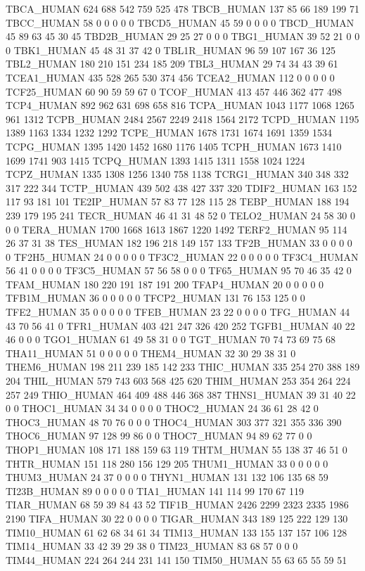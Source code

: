 TBCA_HUMAN	624	688	542	759	525	478
TBCB_HUMAN	137	85	66	189	199	71
TBCC_HUMAN	58	0	0	0	0	0
TBCD5_HUMAN	45	59	0	0	0	0
TBCD_HUMAN	45	89	63	45	30	45
TBD2B_HUMAN	29	25	27	0	0	0
TBG1_HUMAN	39	52	21	0	0	0
TBK1_HUMAN	45	48	31	37	42	0
TBL1R_HUMAN	96	59	107	167	36	125
TBL2_HUMAN	180	210	151	234	185	209
TBL3_HUMAN	29	74	34	43	39	61
TCEA1_HUMAN	435	528	265	530	374	456
TCEA2_HUMAN	112	0	0	0	0	0
TCF25_HUMAN	60	90	59	59	67	0
TCOF_HUMAN	413	457	446	362	477	498
TCP4_HUMAN	892	962	631	698	658	816
TCPA_HUMAN	1043	1177	1068	1265	961	1312
TCPB_HUMAN	2484	2567	2249	2418	1564	2172
TCPD_HUMAN	1195	1389	1163	1334	1232	1292
TCPE_HUMAN	1678	1731	1674	1691	1359	1534
TCPG_HUMAN	1395	1420	1452	1680	1176	1405
TCPH_HUMAN	1673	1410	1699	1741	903	1415
TCPQ_HUMAN	1393	1415	1311	1558	1024	1224
TCPZ_HUMAN	1335	1308	1256	1340	758	1138
TCRG1_HUMAN	340	348	332	317	222	344
TCTP_HUMAN	439	502	438	427	337	320
TDIF2_HUMAN	163	152	117	93	181	101
TE2IP_HUMAN	57	83	77	128	115	28
TEBP_HUMAN	188	194	239	179	195	241
TECR_HUMAN	46	41	31	48	52	0
TELO2_HUMAN	24	58	30	0	0	0
TERA_HUMAN	1700	1668	1613	1867	1220	1492
TERF2_HUMAN	95	114	26	37	31	38
TES_HUMAN	182	196	218	149	157	133
TF2B_HUMAN	33	0	0	0	0	0
TF2H5_HUMAN	24	0	0	0	0	0
TF3C2_HUMAN	22	0	0	0	0	0
TF3C4_HUMAN	56	41	0	0	0	0
TF3C5_HUMAN	57	56	58	0	0	0
TF65_HUMAN	95	70	46	35	42	0
TFAM_HUMAN	180	220	191	187	191	200
TFAP4_HUMAN	20	0	0	0	0	0
TFB1M_HUMAN	36	0	0	0	0	0
TFCP2_HUMAN	131	76	153	125	0	0
TFE2_HUMAN	35	0	0	0	0	0
TFEB_HUMAN	23	22	0	0	0	0
TFG_HUMAN	44	43	70	56	41	0
TFR1_HUMAN	403	421	247	326	420	252
TGFB1_HUMAN	40	22	46	0	0	0
TGO1_HUMAN	61	49	58	31	0	0
TGT_HUMAN	70	74	73	69	75	68
THA11_HUMAN	51	0	0	0	0	0
THEM4_HUMAN	32	30	29	38	31	0
THEM6_HUMAN	198	211	239	185	142	233
THIC_HUMAN	335	254	270	388	189	204
THIL_HUMAN	579	743	603	568	425	620
THIM_HUMAN	253	354	264	224	257	249
THIO_HUMAN	464	409	488	446	368	387
THNS1_HUMAN	39	31	40	22	0	0
THOC1_HUMAN	34	34	0	0	0	0
THOC2_HUMAN	24	36	61	28	42	0
THOC3_HUMAN	48	70	76	0	0	0
THOC4_HUMAN	303	377	321	355	336	390
THOC6_HUMAN	97	128	99	86	0	0
THOC7_HUMAN	94	89	62	77	0	0
THOP1_HUMAN	108	171	188	159	63	119
THTM_HUMAN	55	138	37	46	51	0
THTR_HUMAN	151	118	280	156	129	205
THUM1_HUMAN	33	0	0	0	0	0
THUM3_HUMAN	24	37	0	0	0	0
THYN1_HUMAN	131	132	106	135	68	59
TI23B_HUMAN	89	0	0	0	0	0
TIA1_HUMAN	141	114	99	170	67	119
TIAR_HUMAN	68	59	39	84	43	52
TIF1B_HUMAN	2426	2299	2323	2335	1986	2190
TIFA_HUMAN	30	22	0	0	0	0
TIGAR_HUMAN	343	189	125	222	129	130
TIM10_HUMAN	61	62	68	34	61	34
TIM13_HUMAN	133	155	137	157	106	128
TIM14_HUMAN	33	42	39	29	38	0
TIM23_HUMAN	83	68	57	0	0	0
TIM44_HUMAN	224	264	244	231	141	150
TIM50_HUMAN	55	63	65	55	59	51
